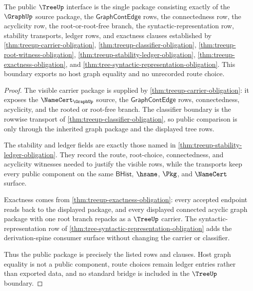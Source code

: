 \begin{theorem}
\label{thm:treeup-public-certificate-boundary}
The public $\TreeUp$ interface is the single package consisting exactly of the $\GraphUp$ source package, the $\mathsf{GraphContEdge}$ rows, the connectedness row, the acyclicity row, the root-or-root-free branch, the syntactic-representation row, stability transports, ledger rows, and exactness clauses established by \autoref{thm:treeup-carrier-obligation}, \autoref{thm:treeup-classifier-obligation}, \autoref{thm:treeup-root-witness-obligation}, \autoref{thm:treeup-stability-ledger-obligation}, \autoref{thm:treeup-exactness-obligation}, and \autoref{thm:tree-syntactic-representation-obligation}. This boundary exports no host graph equality and no unrecorded route choice.
\end{theorem}
\begin{proof}
The visible carrier package is supplied by \autoref{thm:treeup-carrier-obligation}: it exposes the $\NameCert_{\GraphUp}$ source, the $\mathsf{GraphContEdge}$ rows, connectedness, acyclicity, and the rooted or root-free branch. The classifier boundary is the rowwise transport of \autoref{thm:treeup-classifier-obligation}, so public comparison is only through the inherited graph package and the displayed tree rows.

The stability and ledger fields are exactly those named in \autoref{thm:treeup-stability-ledger-obligation}. They record the route, root-choice, connectedness, and acyclicity witnesses needed to justify the visible rows, while the transports keep every public component on the same $\mathsf{BHist}$, $\hsame$, $\Pkg$, and $\NameCert$ surface.

Exactness comes from \autoref{thm:treeup-exactness-obligation}: every accepted endpoint reads back to the displayed package, and every displayed connected acyclic graph package with one root branch repacks as a $\TreeUp$ carrier. The syntactic-representation row of \autoref{thm:tree-syntactic-representation-obligation} adds the derivation-spine consumer surface without changing the carrier or classifier.

Thus the public package is precisely the listed rows and clauses. Host graph equality is not a public component, route choices remain ledger entries rather than exported data, and no standard bridge is included in the $\TreeUp$ boundary.
\end{proof}

